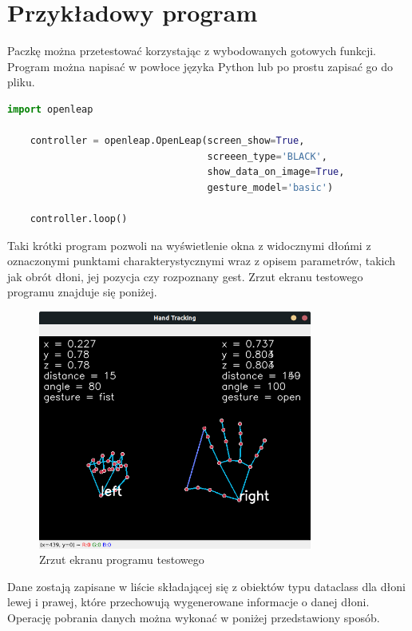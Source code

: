 \section{Przykładowy program}

\quad Paczkę można przetestować korzystając z wybodowanych gotowych funkcji. Program można napisać w powłoce języka Python lub po prostu zapisać go do pliku. 

\begin{lstlisting}[language=python]
    import openleap

    controller = openleap.OpenLeap(screen_show=True, 
                                   screeen_type='BLACK', 
                                   show_data_on_image=True, 
                                   gesture_model='basic')
    
    controller.loop()
\end{lstlisting}

\quad Taki krótki program pozwoli na wyświetlenie okna z widocznymi dłońmi z oznaczonymi punktami charakterystycznymi wraz z opisem parametrów, takich jak obrót dłoni, jej pozycja czy rozpoznany gest. Zrzut ekranu testowego programu znajduje się poniżej. 

\begin{figure}[H]
    \begin{center}
        \includegraphics[width=9cm]{../images/example_program.png}
        \caption{Zrzut ekranu programu testowego}
    \end{center}
\end{figure}

\quad Dane zostają zapisane w liście składającej się z obiektów typu dataclass dla dłoni lewej i prawej, które przechowują wygenerowane informacje o danej dłoni. Operację pobrania danych można wykonać w poniżej przedstawiony sposób. 

